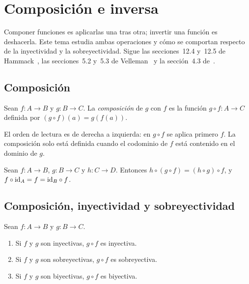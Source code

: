 \chapter{Composición e inversa}
\label{tema:4}

Componer funciones es aplicarlas una tras otra; invertir una función es deshacerla. Este tema estudia ambas operaciones y cómo se comportan respecto de la inyectividad y la sobreyectividad. Sigue las secciones~12.4 y~12.5 de Hammack~\cite{hammack}, las secciones~5.2 y~5.3 de Velleman~\cite{velleman} y la sección~4.3 de~\cite{mcs}.

\section{Composición}

\begin{definicion}[Composición]
Sean $f\colon A\to B$ y $g\colon B\to C$. La \emph{composición} de $g$ con $f$ es la función $g\circ f\colon A\to C$ definida por $(g\circ f)(a)=g(f(a))$.
\end{definicion}

El orden de lectura es de derecha a izquierda: en $g\circ f$ se aplica primero $f$. La composición solo está definida cuando el codominio de $f$ está contenido en el dominio de $g$.

\addtocounter{definicion}{1}%

\begin{proposicion}\label{prop:t4-asoc}
Sean $f\colon A\to B$, $g\colon B\to C$ y $h\colon C\to D$. Entonces $h\circ(g\circ f)=(h\circ g)\circ f$, y $f\circ\mathrm{id}_A=f=\mathrm{id}_B\circ f$.
\end{proposicion}

\section{Composición, inyectividad y sobreyectividad}

\begin{teorema}\label{teo:t4-comp}
Sean $f\colon A\to B$ y $g\colon B\to C$.
\begin{enumerate}
  \item Si $f$ y $g$ son inyectivas, $g\circ f$ es inyectiva.
  \item Si $f$ y $g$ son sobreyectivas, $g\circ f$ es sobreyectiva.
  \item Si $f$ y $g$ son biyectivas, $g\circ f$ es biyectiva.
\end{enumerate}
\end{teorema}

